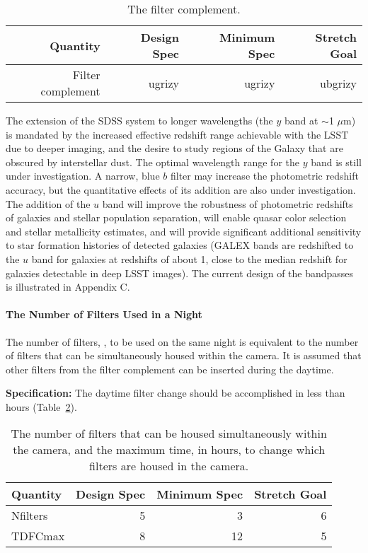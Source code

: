 \begin{table}[h!]
\begin{tabular}{|r|r|r|r|}
\hline
Quantity               & Design Spec & Minimum Spec & Stretch Goal      \\
\hline
 Filter complement     &   ugrizy      &   ugrizy       &   ubgrizy \\
\hline
\end{tabular}
\caption{The filter complement.}
\label{Tfilters}
\end{table}

The extension of the SDSS system to longer wavelengths (the $y$ band at
$\sim$1 $\mu$m) is
mandated by the increased effective redshift range achievable with the LSST
due to deeper imaging, and the desire to study regions of the Galaxy that
are obscured by interstellar dust.
The optimal wavelength range for the $y$ band is
still under investigation. A narrow, blue $b$ filter may increase the
photometric redshift accuracy, but the quantitative effects of its addition
are also under investigation. The addition of the $u$ band will improve the
robustness of photometric redshifts of galaxies and stellar population
separation, will enable quasar color selection and stellar metallicity
estimates, and will provide significant additional sensitivity to star
formation histories of detected galaxies (\eg GALEX bands are redshifted
to the $u$ band for galaxies at redshifts of about 1, close to the median
redshift for galaxies detectable in deep LSST images). The current design of
the bandpasses is illustrated in Appendix C.


\paragraph{The Number of Filters Used in a Night\\}

The number of filters,
,
to be used on the same night is
equivalent to the number of filters that can be simultaneously housed
within the camera. It is assumed that other filters from the filter
complement can be inserted during the daytime.

{\bf Specification:} The daytime filter change should be accomplished in less than
hours (Table~\ref{Tfilterchanges}).

\begin{table}[h]
\begin{tabular}{|l|r|r|r|}
\hline
Quantity        & Design Spec & Minimum Spec & Stretch Goal      \\
\hline
 Nfilters       &      5      &      3       &       6           \\
 TDFCmax        &      8      &     12       &       5           \\
\hline
\end{tabular}
\caption{The number of filters that can be housed simultaneously within the
camera, and the maximum time, in hours, to change which filters are housed
in the camera.}
\label{Tfilterchanges}
\end{table}

